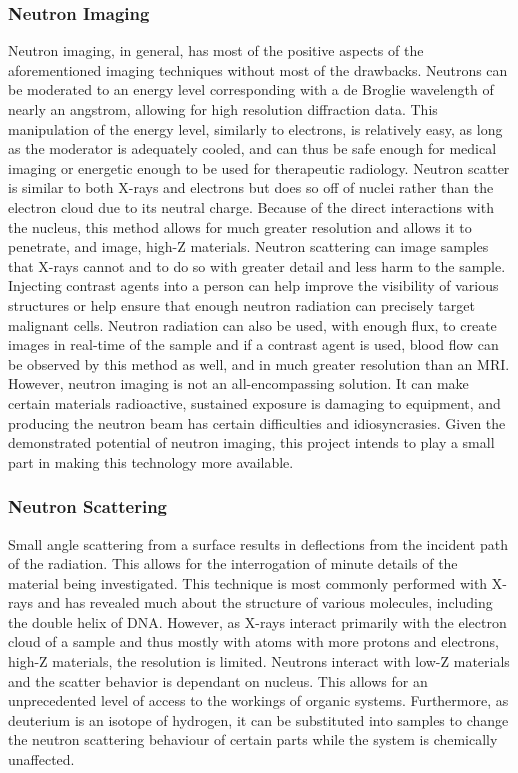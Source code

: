 \subsubsection{Neutron Imaging}

Neutron imaging, in general, has most of the positive aspects of the aforementioned imaging techniques without most of the drawbacks. Neutrons can be moderated to an energy level corresponding with a de Broglie wavelength of nearly an angstrom, allowing for high resolution diffraction data. This manipulation of the energy level, similarly to electrons, is relatively easy, as long as the moderator is adequately cooled, and can thus be safe enough for medical imaging or energetic enough to be used for therapeutic radiology. Neutron scatter is similar to both X-rays and electrons but does so off of nuclei rather than the electron cloud due to its neutral charge. Because of the direct interactions with the nucleus, this method allows for much greater resolution and allows it to penetrate, and image, high-Z materials. Neutron scattering can image samples that X-rays cannot and to do so with greater detail and less harm to the sample. Injecting contrast agents into a person can help improve the visibility of various structures or help ensure that enough neutron radiation can precisely target malignant cells. Neutron radiation can also be used, with enough flux, to create images in real-time of the sample and if a contrast agent is used, blood flow can be observed by this method as well, and in much greater resolution than an MRI. However, neutron imaging is not an all-encompassing solution. It can make certain materials radioactive, sustained exposure is damaging to equipment, and producing the neutron beam has certain difficulties and idiosyncrasies. Given the demonstrated potential of neutron imaging, this project intends to play a small part in making this technology more available.

\subsubsection{Neutron Scattering}

Small angle scattering from a surface results in deflections from the incident path of the radiation. This allows for the interrogation of minute details of the material being investigated. This technique is most commonly performed with X-rays and has revealed much about the structure of various molecules, including the double helix of DNA. However, as X-rays interact primarily with the electron cloud of a sample and thus mostly with atoms with more protons and electrons, high-Z materials, the resolution is limited. Neutrons interact with low-Z materials and the scatter behavior is dependant on nucleus. This allows for an unprecedented level of access to the workings of organic systems. Furthermore, as deuterium is an isotope of hydrogen, it can be substituted into samples to change the neutron scattering behaviour of certain parts while the system is chemically unaffected.

